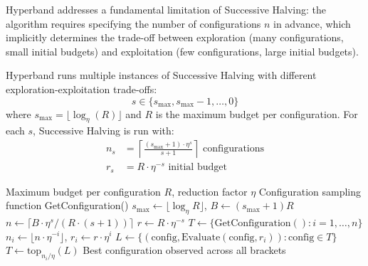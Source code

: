 Hyperband addresses a fundamental limitation of Successive Halving: the algorithm requires specifying the number of configurations $n$ in advance, which implicitly determines the trade-off between exploration (many configurations, small initial budgets) and exploitation (few configurations, large initial budgets).

\begin{definition}[Hyperband]
\label{def:hyperband}
Hyperband runs multiple instances of Successive Halving with different exploration-exploitation trade-offs:
\begin{equation}
s \in \{s_{\max}, s_{\max}-1, \ldots, 0\}
\end{equation}
where $s_{\max} = \lfloor \log_\eta(R) \rfloor$ and $R$ is the maximum budget per configuration. For each $s$, Successive Halving is run with:
\begin{align}
n_s &= \left\lceil \frac{(s_{\max} + 1) \cdot \eta^s}{s + 1} \right\rceil \text{ configurations} \\
r_s &= R \cdot \eta^{-s} \text{ initial budget}
\end{align}
\end{definition}

\begin{algorithm}[htbp]
\caption{Hyperband}
\label{alg:hyperband}
\begin{algorithmic}[1]
\Require Maximum budget per configuration $R$, reduction factor $\eta$
\Require Configuration sampling function GetConfiguration()
\State $s_{\max} \leftarrow \lfloor \log_\eta R \rfloor$, $B \leftarrow (s_{\max} + 1) R$
 
    \State $n \leftarrow \lceil B \cdot \eta^s / (R \cdot (s+1)) \rceil$ 
    \State $r \leftarrow R \cdot \eta^{-s}$ 
    \State $T \leftarrow \{\text{GetConfiguration}() : i = 1, \ldots, n\}$ 
     
        \State $n_i \leftarrow \lfloor n \cdot \eta^{-i} \rfloor$, $r_i \leftarrow r \cdot \eta^i$
        \State $L \leftarrow \{(\text{config}, \text{Evaluate}(\text{config}, r_i)) : \text{config} \in T\}$
        \State $T \leftarrow \text{top}_{n_i / \eta}(L)$
    \EndFor
\EndFor
\State \Return Best configuration observed across all brackets
\end{algorithmic}
\end{algorithm}

